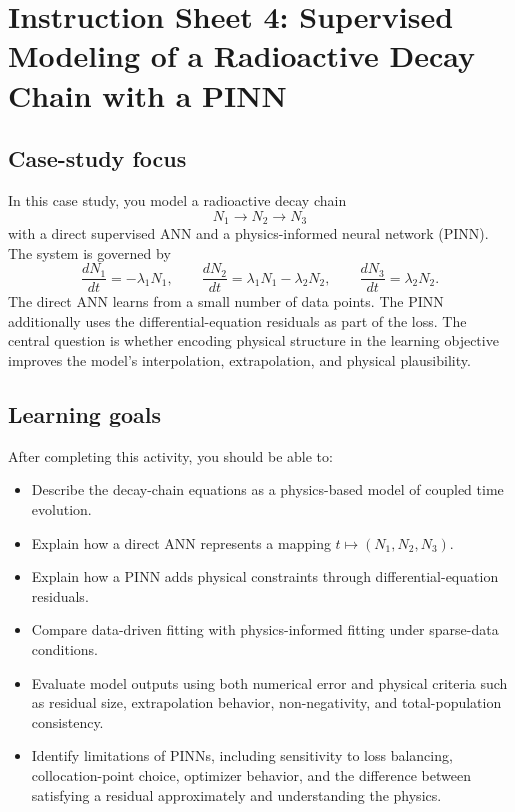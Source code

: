 \section*{Instruction Sheet 4: Supervised Modeling of a Radioactive Decay Chain with a PINN}

\subsection*{Case-study focus}
In this case study, you model a radioactive decay chain
\[
N_1 \rightarrow N_2 \rightarrow N_3
\]
with a direct supervised ANN and a physics-informed neural network (PINN). The system is governed by
\[
\frac{dN_1}{dt}=-\lambda_1N_1,\qquad
\frac{dN_2}{dt}=\lambda_1N_1-\lambda_2N_2,\qquad
\frac{dN_3}{dt}=\lambda_2N_2.
\]
The direct ANN learns from a small number of data points. The PINN additionally uses the differential-equation residuals as part of the loss. The central question is whether encoding physical structure in the learning objective improves the model's interpolation, extrapolation, and physical plausibility.

\subsection*{Learning goals}
After completing this activity, you should be able to:
\begin{itemize}
    \item Describe the decay-chain equations as a physics-based model of coupled time evolution.
    \item Explain how a direct ANN represents a mapping \(t\mapsto (N_1,N_2,N_3)\).
    \item Explain how a PINN adds physical constraints through differential-equation residuals.
    \item Compare data-driven fitting with physics-informed fitting under sparse-data conditions.
    \item Evaluate model outputs using both numerical error and physical criteria such as residual size, extrapolation behavior, non-negativity, and total-population consistency.
    \item Identify limitations of PINNs, including sensitivity to loss balancing, collocation-point choice, optimizer behavior, and the difference between satisfying a residual approximately and understanding the physics.
\end{itemize}

